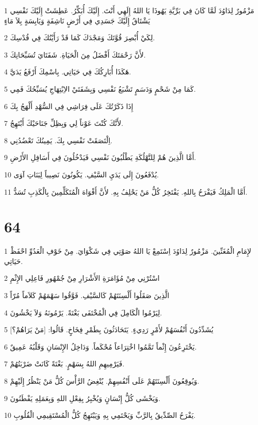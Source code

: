 \par 1 مَزْمُورٌ لِدَاوُدَ لَمَّا كَانَ فِي بَرِّيَّةِ يَهُوذَا يَا اللهُ إِلَهِي أَنْتَ. إِلَيْكَ أُبَكِّرُ. عَطِشَتْ إِلَيْكَ نَفْسِي يَشْتَاقُ إِلَيْكَ جَسَدِي فِي أَرْضٍ نَاشِفَةٍ وَيَابِسَةٍ بِلاَ مَاءٍ
\par 2 لِكَيْ أُبْصِرَ قُوَّتَكَ وَمَجْدَكَ كَمَا قَدْ رَأَيْتُكَ فِي قُدْسِكَ.
\par 3 لأَنَّ رَحْمَتَكَ أَفْضَلُ مِنَ الْحَيَاةِ. شَفَتَايَ تُسَبِّحَانِكَ.
\par 4 هَكَذَا أُبَارِكُكَ فِي حَيَاتِي. بِاسْمِكَ أَرْفَعُ يَدَيَّ.
\par 5 كَمَا مِنْ شَحْمٍ وَدَسَمٍ تَشْبَعُ نَفْسِي وَبِشَفَتَيْ الاِبْتِهَاجِ يُسَبِّحُكَ فَمِي.
\par 6 إِذَا ذَكَرْتُكَ عَلَى فِرَاشِي فِي السُّهْدِ أَلْهَجُ بِكَ
\par 7 لأَنَّكَ كُنْتَ عَوْناً لِي وَبِظِلِّ جَنَاحَيْكَ أَبْتَهِجُ.
\par 8 اِلْتَصَقَتْ نَفْسِي بِكَ. يَمِينُكَ تَعْضُدُنِي.
\par 9 أَمَّا الَّذِينَ هُمْ لِلتَّهْلُكَةِ يَطْلُبُونَ نَفْسِي فَيَدْخُلُونَ فِي أَسَافِلِ الأَرْضِ.
\par 10 يُدْفَعُونَ إِلَى يَدَيِ السَّيْفِ. يَكُونُونَ نَصِيباً لِبَنَاتِ آوَى.
\par 11 أَمَّا الْمَلِكُ فَيَفْرَحُ بِاللهِ. يَفْتَخِرُ كُلُّ مَنْ يَحْلِفُ بِهِ. لأَنَّ أَفْوَاهَ الْمُتَكَلِّمِينَ بِالْكَذِبِ تُسَدُّ.

\chapter{64}

\par 1 لإِمَامِ الْمُغَنِّينَ. مَزْمُورٌ لِدَاوُدَ اِسْتَمِعْ يَا اللهُ صَوْتِي فِي شَكْوَايَ. مِنْ خَوْفِ الْعَدُوِّ احْفَظْ حَيَاتِي.
\par 2 اسْتُرْنِي مِنْ مُؤَامَرَةِ الأَشْرَارِ مِنْ جُمْهُورِ فَاعِلِي الإِثْمِ
\par 3 الَّذِينَ صَقَلُوا أَلْسِنَتَهُمْ كَالسَّيْفِ. فَوَّقُوا سَهْمَهُمْ كَلاَماً مُرّاً
\par 4 لِيَرْمُوا الْكَامِلَ فِي الْمُخْتَفَى بَغْتَةً. يَرْمُونَهُ وَلاَ يَخْشُونَ.
\par 5 يُشَدِّدُونَ أَنْفُسَهُمْ لأَمْرٍ رَدِيءٍ. يَتَحَادَثُونَ بِطَمْرِ فِخَاخٍ. قَالُوا: [مَنْ يَرَاهُمْ؟]
\par 6 يَخْتَرِعُونَ إِثْماً تَمَّمُوا اخْتِرَاعاً مُحْكَماً. وَدَاخِلُ الإِنْسَانِ وَقَلْبُهُ عَمِيقٌ.
\par 7 فَيَرْمِيهِمِ اللهُ بِسَهْمٍ. بَغْتَةً كَانَتْ ضَرْبَتُهُمْ.
\par 8 وَيُوقِعُونَ أَلْسِنَتَهُمْ عَلَى أَنْفُسِهِمْ. يُنْغِضُ الرَّأْسَ كُلُّ مَنْ يَنْظُرُ إِلَيْهِمْ.
\par 9 وَيَخْشَى كُلُّ إِنْسَانٍ وَيُخْبِرُ بِفِعْلِ اللهِ وَبِعَمَلِهِ يَفْطَنُونَ.
\par 10 يَفْرَحُ الصِّدِّيقُ بِالرَّبِّ وَيَحْتَمِي بِهِ وَيَبْتَهِجُ كُلُّ الْمُسْتَقِيمِي الْقُلُوبِ.

